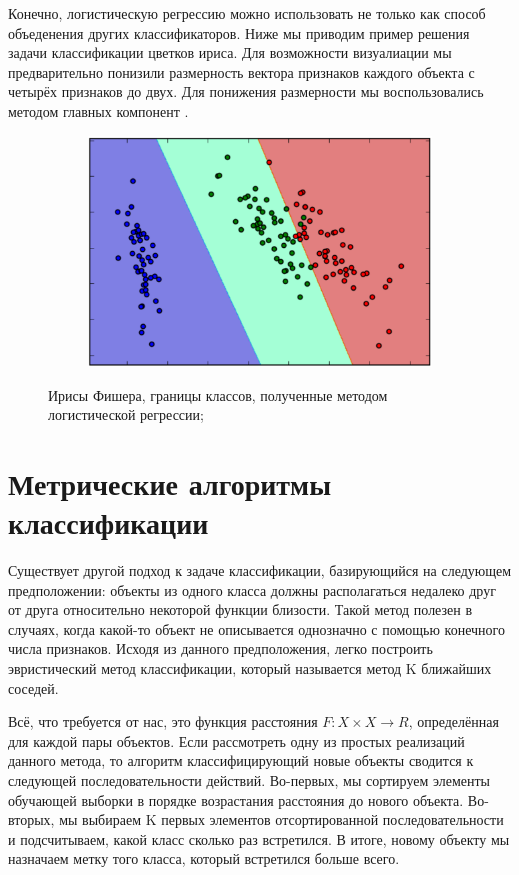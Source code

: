 Конечно, логистическую регрессию можно использовать не только как способ объеденения других классификаторов. Ниже мы приводим пример решения задачи классификации цветков ириса. Для возможности визуалиации мы предварительно понизили размерность вектора признаков каждого объекта с четырёх признаков до двух. Для понижения размерности мы воспользовались методом главных компонент \cite{pca_book}\cite{pca_program}.

\begin{figure}[ht]
	\centering
    \begin{subfigure}[b]{1\textwidth}
    \centering
        \includegraphics[scale=0.5]{pasted-image-19.png}        
    \end{subfigure}
 
    \caption{Ирисы Фишера, границы классов, полученные методом логистической регрессии;}
    \label{fig_parsetree}
\end{figure}

\section{Метрические алгоритмы классификации}

Существует другой подход к задаче классификации, базирующийся на следующем предположении: объекты из одного класса должны располагаться недалеко друг от друга относительно некоторой функции близости. Такой метод полезен в случаях, когда какой-то объект не описывается однозначно с помощью конечного числа признаков. Исходя из данного предположения, легко построить эвристический метод классификации, который называется метод K ближайших соседей.

Всё, что требуется от нас, это функция расстояния $F : X \times X \to R$, определённая для каждой пары объектов. Если рассмотреть одну из простых реализаций данного метода, то алгоритм классифицирующий новые объекты сводится к следующей последовательности действий.
Во-первых, мы сортируем элементы обучающей выборки в порядке возрастания  расстояния до нового объекта.
Во-вторых, мы выбираем K первых элементов отсортированной последовательности и подсчитываем, какой класс сколько раз встретился.
В итоге, новому объекту мы назначаем метку того класса, который встретился больше всего.


